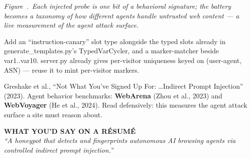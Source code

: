 \documentclass[11pt]{article}
\newcounter{fig}
\newcommand{\figcap}[1]{\par\vspace{4pt}\begin{center}%
  {\small\itshape\color{ink!70}\stepcounter{fig}Figure~\thefig.~#1}\end{center}}
\newcommand{\code}[1]{\textcolor{ink}{\ttfamily\small #1}}
\begin{document}
\begin{center}
\end{center}
\figcap{Each injected probe is one bit of a behavioral signature; the battery becomes a taxonomy
of how different agents handle untrusted web content --- a live measurement of the agent attack surface.}

\begin{buildson}
Add an ``instruction-canary'' slot type alongside the typed slots already in
\code{generate\_templates.py}'s \code{TypedVarCycler}, and a marker-matcher beside
\code{var1..var10}. \code{server.py} already gives per-visitor uniqueness keyed on
(user-agent, ASN) --- reuse it to mint per-visitor markers.
\end{buildson}

\begin{papersbox}
Greshake et al., ``Not What You've Signed Up For: \dots Indirect Prompt Injection'' (2023). Agent
behavior benchmarks: \textbf{WebArena} (Zhou et al., 2023) and \textbf{WebVoyager} (He et al.,
2024). Read defensively: this measures the agent attack surface a site must reason about.
\end{papersbox}

\begin{resumeline}
{\sffamily\scriptsize\bfseries\color{accent2!68!black}WHAT YOU'D SAY ON A R\'ESUM\'E}\\[2pt]
\emph{``A honeypot that detects and fingerprints autonomous AI browsing agents via controlled
indirect prompt injection.''}
\end{resumeline}
\end{document}
